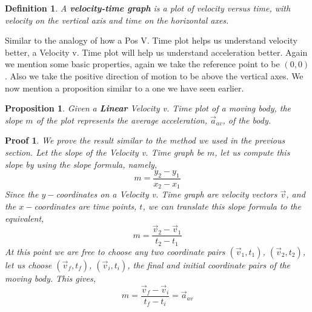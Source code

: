 \documentclass[12pt]{article}
\theoremstyle{break}
\newtheorem*{pf}{Proof}
\newtheorem{defn}{Definition}[subsection]
\newtheorem{prop}[thm]{Proposition}
\begin{document}
\begin{defn}
A \textbf{velocity-time graph} is a plot of velocity versus time, with velocity on the vertical axis and time on the horizontal axes.
\end{defn}
Similar to the analogy of how a Pos V. Time plot helps us understand velocity better, a Velocity v. Time plot will help us understand acceleration better. Again we mention some basic properties, again we take the reference point to be $(0,0)$. Also we take the positive direction of motion to be above the vertical axes. We now mention a proposition similar to a one we have seen earlier.
\begin{prop}
Given a \textbf{Linear} Velocity v. Time plot of a moving body, the slope $m$ of the plot represents the average acceleration, $\vec a_{av}$, of the body.
\end{prop}
\begin{pf}
We prove the result similar to the method we used in the previous section. Let the slope of the Velocity v. Time graph be $m$, let us compute this slope by using the slope formula, namely,
$$m = \frac{y_2 - y_1}{x_2 - x_1}$$
Since the $y-$coordinates on a Velocity v. Time graph are velocity vectors $\vec v$, and the $x-$coordinates are time points, $t$, we can translate this slope formula to the equivalent,
$$m = \frac{\vec v_2 - \vec v_1}{t_2 - t_1}$$
At this point we are free to choose any two coordinate pairs $(\vec v_1,t_1)$, $(\vec v_2, t_2)$, let us choose $(\vec v_f, t_f)$, $(\vec v_i, t_i)$, the final and initial coordinate pairs of the moving body. This gives,
$$m = \frac{\vec v_f - \vec v_i}{t_f - t_i} = \vec a_{av}$$ 
\end{pf}
\end{document}
